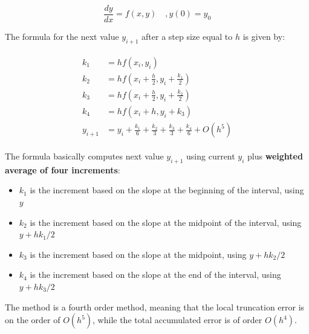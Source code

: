 \documentclass[10pt,b5paper,titlepage]{book}
\newenvironment{eqarray}
{
    \begin{eqnarray}
        \begin{aligned}
}
{
        \end{aligned}
    \end{eqnarray}
}
\begin{document}
\begin{equation}
    \frac{dy}{dx} = f(x,y) \quad , y(0) = y_0
\end{equation}

The formula for the next value $ y_{i+1} $ after a step size equal to $h $ is given by:

\begin{eqarray}
    k_1 &= h f(x_i, y_i)\\
    k_2 &= h f(x_i + \frac{h}{2}, y_i + \frac{k_1}{2})\\
    k_3 &= h f(x_i + \frac{h}{2}, y_i + \frac{k_2}{2})\\
    k_4 &= h f(x_i + h, y_i + k_3)\\
    y_{i+1} &= y_i + \frac{k_1}{6} + \frac{k_2}{3} + \frac{k_3}{3} + \frac{k_4}{6} + O(h^5)
\end{eqarray}

The formula basically computes next value $ y_{i+1} $ using current $ y_i $ plus
\textbf{weighted average of four increments}:

\begin{itemize}
    \item $ k_1 $ is the increment based on the slope at the beginning of the
    interval, using $ y $

    \item $ k_2 $ is the increment based on the slope at the midpoint of the interval,
        using $ y + h k_1 / 2 $

    \item $ k_3 $ is the increment based on the slope at the midpoint,
        using $ y + h k_2 / 2 $

    \item $ k_4 $ is the increment based on the slope at the end of the interval,
        using $ y + h k_3 / 2 $

\end{itemize}

The method is a fourth order method, meaning that the local truncation error is
on the order of $ O(h^5) $, while the total accumulated error is of order $ O(h^4) $.
\end{document}
